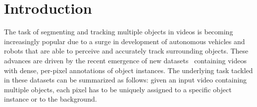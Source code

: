 \documentclass[runningheads]{llncs}
\begin{document}
\section{Introduction}

The task of segmenting and tracking multiple objects in videos is becoming increasingly popular due to a surge in development of autonomous vehicles and robots that are able to perceive and accurately track surrounding objects.  
These advances are driven by the recent emergence of new datasets~\cite{Caelles19arXiv,Voigtlaender19CVPR,Yang19ICCV} containing videos with dense, per-pixel annotations of object instances.
The underlying task tackled in these datasets can be summarized as follows: given an input video containing multiple objects, each pixel has to be uniquely assigned to a specific object instance or to the background.
\end{document}
